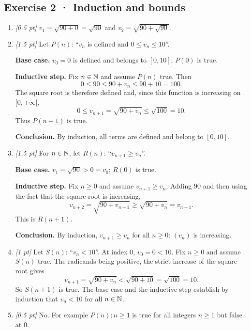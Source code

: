 \subsection*{Exercise 2 · Induction and bounds}\begin{enumerate}

\item \textit{[0.5 pt]} $v_1=\sqrt{90+0}=\sqrt{90}$ and $v_2=\sqrt{90+\sqrt{90}}$.

\item \textit{[1.5 pt]} Let $P(n)$: ``$v_n$ is defined and $0\le v_n\le 10$''.
\par\smallskip\textbf{Base case.} $v_0=0$ is defined and belongs to $[0,10]$; $P(0)$ is true.
\par\smallskip\textbf{Inductive step.} Fix $n\in\mathbb N$ and assume $P(n)$ true. Then
\[0\le 90\le 90+v_n\le 90+10=100.\]
The square root is therefore defined and, since this function is increasing on $[0,+\infty[$,
\[0\le v_{n+1}=\sqrt{90+v_n}\le\sqrt{100}=10.\]
Thus $P(n+1)$ is true.
\par\smallskip\textbf{Conclusion.} By induction, all terms are defined and belong to $[0,10]$.

\item \textit{[1.5 pt]} For $n\in\mathbb N$, let $R(n)$: ``$v_{n+1}\ge v_n$''.
\par\smallskip\textbf{Base case.} $v_1=\sqrt{90}>0=v_0$; $R(0)$ is true.
\par\smallskip\textbf{Inductive step.} Fix $n\ge0$ and assume $v_{n+1}\ge v_n$. Adding $90$ and then using the fact that the square root is increasing,
\[v_{n+2}=\sqrt{90+v_{n+1}}\ge\sqrt{90+v_n}=v_{n+1}.\]
This is $R(n+1)$.
\par\smallskip\textbf{Conclusion.} By induction, $v_{n+1}\ge v_n$ for all $n\ge0$: $(v_n)$ is increasing.

\item \textit{[1 pt]} Let $S(n)$: ``$v_n<10$''. At index $0$, $v_0=0<10$.
Fix $n\ge0$ and assume $S(n)$ true. The radicands being positive, the strict increase of the square root gives
\[v_{n+1}=\sqrt{90+v_n}<\sqrt{90+10}=\sqrt{100}=10.\]
So $S(n+1)$ is true. The base case and the inductive step establish by induction that $v_n<10$ for all $n\in\mathbb N$.

\item \textit{[0.5 pt]} No. For example $P(n):n\ge1$ is true for all integers $n\ge1$ but false at $0$.

\end{enumerate}

